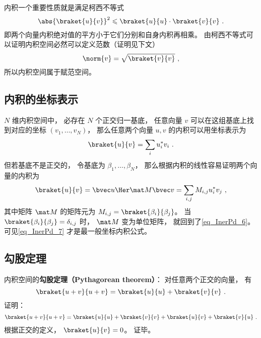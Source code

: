 内积一个重要性质就是满足柯西不等式
\begin{equation}
\abs{\braket{u}{v}}^2 \leqslant \braket{u}{u} \cdot \braket{v}{v}~.
\end{equation}
即两个向量内积绝对值的平方小于它们分别和自身内积再相乘。 由柯西不等式可以证明内积空间必然可以定义范数（证明见下文）
\begin{equation}\label{eq_InerPd_8}
\norm{v} = \sqrt{\braket{v}{v}}~,
\end{equation}
所以内积空间属于赋范空间。

\subsection{内积的坐标表示}
$N$ 维内积空间中， 必存在 $N$ 个正交归一基底， 任意向量 $v$ 可以在这组基底上找到对应的坐标 $(v_1, \dots, v_N)$， 那么任意两个向量 $u, v$ 的内积可以用坐标表示为
\begin{equation}\label{eq_InerPd_6}
\braket{u}{v} = \sum_i u_i^* v_i~.
\end{equation}
但若基底不是正交的， 令基底为 $\beta_1, \dots, \beta_N$， 那么根据内积的线性容易证明两个向量的内积为
\begin{equation}\label{eq_InerPd_7}
\braket{u}{v} = \bvec u\Her \mat M \bvec v = \sum_{i,j} M_{i,j} u_i^* v_j~,
\end{equation}
其中矩阵 $\mat M$ 的矩阵元为 $M_{i,j} = \braket{\beta_i}{\beta_j}$。 当 $\braket{\beta_i}{\beta_j} = \delta_{i,j}$ 时， $\mat M$ 变为单位矩阵， 就回到了\autoref{eq_InerPd_6}。 可见\autoref{eq_InerPd_7} 才是最一般坐标内积公式。

\subsection{勾股定理}
内积空间的\textbf{勾股定理（Pythagorean theorem）}： 对任意两个正交的向量， 有
\begin{equation}\label{eq_InerPd_1}
\braket{u + v}{u + v} = \braket{u}{u} + \braket{v}{v}~.
\end{equation}
证明：
\begin{equation}
\braket{u + v}{u + v} = \braket{u}{u} + \braket{v}{v} + \braket{u}{v} + \braket{v}{u}~.
\end{equation}
根据正交的定义， $\braket{u}{v} = 0$。 证毕。

